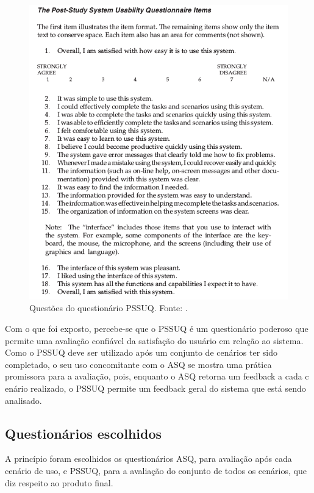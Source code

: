       \begin{figure}[!htpb]
	\centering
	\includegraphics[scale=0.7]{editaveis/figuras/pssuq_questions}
	\caption[Questões do questionário PSSUQ]{Questões do questionário PSSUQ. Fonte: \cite{lewis02}.}
	\label{pssuq_questions}
      \end{figure}
      
      Com o que foi exposto, percebe-se que o PSSUQ é um questionário poderoso que permite uma avaliação confiável da
      satisfação do usuário em relação ao sistema. Como o PSSUQ deve ser utilizado após um conjunto de cenários ter sido
      completado, o seu uso concomitante com o ASQ se mostra uma prática promissora para a avaliação, pois, enquanto o ASQ
      retorna um feedback a cada c
      enário realizado, o PSSUQ permite um feedback geral do sistema que está sendo analisado.
    
    \subsection{Questionários escolhidos}

      A princípio foram escolhidos os questionários ASQ, para avaliação após cada cenário de uso, e PSSUQ, para a avaliação do conjunto
      de todos os cenários, que diz respeito ao produto final.
    
